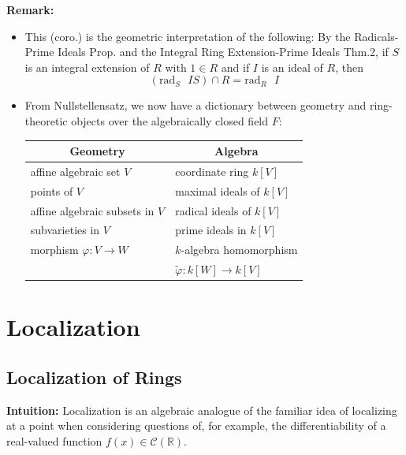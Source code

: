 \noindent\textbf{Remark:} \begin{itemize}
    \item This (coro.) is the geometric interpretation of the following: By the Radicals-Prime Ideals Prop. and the Integral Ring Extension-Prime Ideals Thm.2, if $S$ is an integral extension of $R$ with $1 \in R$ and if $I$ is an ideal of $R$, then
    $$(\text{rad}_S \text{ } IS) \cap R= \text{rad}_R \text{ } I$$

    \item From Nullstellensatz, we now have a dictionary between geometry and ring-theoretic objects over the algebraically closed field $F$:
    \begin{center}
    \pagebreak[3] %
    \gdef\atemp{\renewcommand{\arraystretch}{1.4}} %
    \atemp
    \begin{tabular}{ll}
    \hline \hline
    \multicolumn{1}{c}{\textbf{Geometry}} & \multicolumn{1}{c}{\textbf{Algebra}} \\ \hline
    affine algebraic set $V$              & coordinate ring $k[V]$               \\
    points of $V$                        & maximal ideals of $k[V]$             \\
    affine algebraic subsets in $V$       & radical ideals of $k[V]$             \\
    subvarieties in $V$                  & prime ideals in $k[V]$               \\
    morphism $\varphi \colon V \to W$    & $k$-algebra homomorphism             \\
                                        & \quad $\widetilde{\varphi} \colon k[W] \to k[V]$ \\ \hline \hline
\end{tabular}
\end{center}
\end{itemize}

\section{Localization}

\subsection{Localization of Rings}

\noindent\textbf{Intuition:} Localization is an algebraic analogue of the familiar idea of localizing at a point when considering questions of, for example, the differentiability of a real-valued function $f(x) \in \mathcal{C}(\mathbb{R})$.


